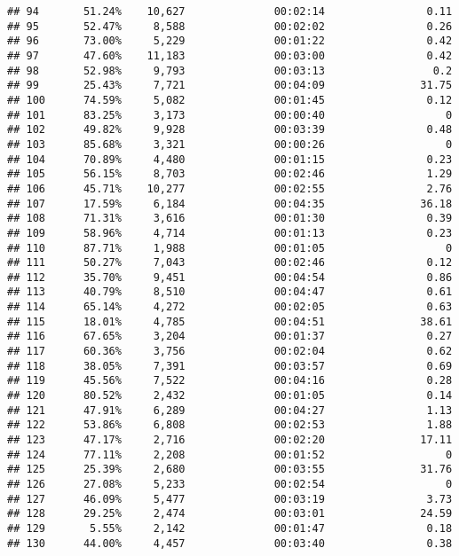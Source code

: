 \documentclass[
]{article}
\begin{document}
\begin{verbatim}
## 94       51.24%    10,627              00:02:14                0.11
## 95       52.47%     8,588              00:02:02                0.26
## 96       73.00%     5,229              00:01:22                0.42
## 97       47.60%    11,183              00:03:00                0.42
## 98       52.98%     9,793              00:03:13                 0.2
## 99       25.43%     7,721              00:04:09               31.75
## 100      74.59%     5,082              00:01:45                0.12
## 101      83.25%     3,173              00:00:40                   0
## 102      49.82%     9,928              00:03:39                0.48
## 103      85.68%     3,321              00:00:26                   0
## 104      70.89%     4,480              00:01:15                0.23
## 105      56.15%     8,703              00:02:46                1.29
## 106      45.71%    10,277              00:02:55                2.76
## 107      17.59%     6,184              00:04:35               36.18
## 108      71.31%     3,616              00:01:30                0.39
## 109      58.96%     4,714              00:01:13                0.23
## 110      87.71%     1,988              00:01:05                   0
## 111      50.27%     7,043              00:02:46                0.12
## 112      35.70%     9,451              00:04:54                0.86
## 113      40.79%     8,510              00:04:47                0.61
## 114      65.14%     4,272              00:02:05                0.63
## 115      18.01%     4,785              00:04:51               38.61
## 116      67.65%     3,204              00:01:37                0.27
## 117      60.36%     3,756              00:02:04                0.62
## 118      38.05%     7,391              00:03:57                0.69
## 119      45.56%     7,522              00:04:16                0.28
## 120      80.52%     2,432              00:01:05                0.14
## 121      47.91%     6,289              00:04:27                1.13
## 122      53.86%     6,808              00:02:53                1.88
## 123      47.17%     2,716              00:02:20               17.11
## 124      77.11%     2,208              00:01:52                   0
## 125      25.39%     2,680              00:03:55               31.76
## 126      27.08%     5,233              00:02:54                   0
## 127      46.09%     5,477              00:03:19                3.73
## 128      29.25%     2,474              00:03:01               24.59
## 129       5.55%     2,142              00:01:47                0.18
## 130      44.00%     4,457              00:03:40                0.38

\end{verbatim}
\end{document}
